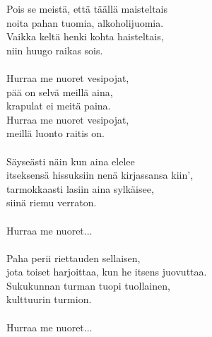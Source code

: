 
            Pois se meistä, että täällä maisteltais \\
            noita pahan tuomia, alkoholijuomia. \\
            Vaikka keltä henki kohta haisteltais, \\
            niin huugo raikas sois. \\
\hspace{10mm} \\
            Hurraa me nuoret vesipojat, \\
            pää on selvä meillä aina, \\
            krapulat ei meitä paina. \\
            Hurraa me nuoret vesipojat, \\
            meillä luonto raitis on. \\
\hspace{10mm} \\
            Säyseästi näin kun aina elelee \\
            itseksensä hissuksiin nenä kirjassansa kiin', \\
            tarmokkaasti lasiin aina sylkäisee, \\
            siinä riemu verraton. \\
\hspace{10mm} \\
            Hurraa me nuoret... \\
\hspace{10mm} \\
            Paha perii riettauden sellaisen, \\
            jota toiset harjoittaa, kun he itsens juovuttaa. \\
            Sukukunnan turman tuopi tuollainen, \\
            kulttuurin turmion. \\
\hspace{10mm} \\
            Hurraa me nuoret... \\
\hspace{10mm} \\
